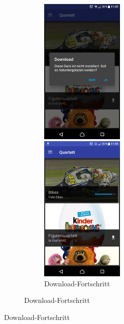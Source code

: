 \documentclass{scrartcl}
\begin{document}
\begin{figure}[!ht]
\begin{figure}[!ht]
\begin{figure}
  \centering
  \begin{minipage}{0.45\textwidth}
    \centering
    \includegraphics[width=4cm]{img/gallery_dialog.png}
    \caption{Download-Dialog}
  \end{minipage}
  \hfill
  \begin{minipage}{0.45\textwidth}
    \centering
    \includegraphics[width=4cm]{img/gallery_download.png}
    \caption{Download-Fortschritt}
  \end{minipage}
\end{figure}


\end{figure}
\end{figure}
\end{document}
